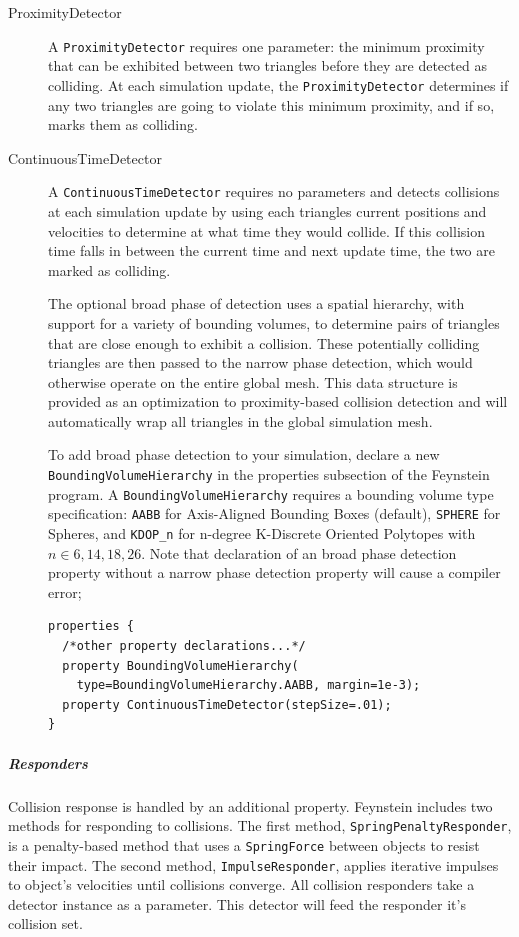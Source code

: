 \begin{description}
\item[ProximityDetector] A \texttt{ProximityDetector} requires one
  parameter: the minimum proximity that can be exhibited between two
  triangles before they are detected as colliding. At each simulation
  update, the \texttt{ProximityDetector} determines if any two
  triangles are going to violate this minimum proximity, and if so,
  marks them as colliding.

\item[ContinuousTimeDetector] A \texttt{ContinuousTimeDetector}
  requires no parameters and detects collisions at each simulation
  update by using each triangles current positions and velocities to
  determine at what time they would collide. If this collision time
  falls in between the current time and next update time, the two are
  marked as colliding.

  The optional broad phase of detection uses a spatial hierarchy, with
  support for a variety of bounding volumes, to determine pairs of
  triangles that are close enough to exhibit a collision. These
  potentially colliding triangles are then passed to the narrow phase
  detection, which would otherwise operate on the entire global
  mesh. This data structure is provided as an optimization to
  proximity-based collision detection and will automatically wrap all
  triangles in the global simulation mesh.

  To add broad phase detection to your simulation, declare a new
  \texttt{Bounding\-Volume\-Hierarchy} in the properties subsection of
  the Feynstein program. A \texttt{Bounding\-Volume\-Hierarchy}
  requires a bounding volume type specification: \texttt{AABB} for
  Axis-Aligned Bounding Boxes (default), \texttt{SPHERE} for Spheres,
  and \texttt{KDOP\_n} for n-degree K-Discrete Oriented Polytopes with
  $n \in {6, 14, 18, 26}$. Note that declaration of an broad phase
  detection property without a narrow phase detection property will
  cause a compiler error;

\begin{verbatim}
properties {
  /*other property declarations...*/
  property BoundingVolumeHierarchy(
    type=BoundingVolumeHierarchy.AABB, margin=1e-3);
  property ContinuousTimeDetector(stepSize=.01);
}
\end{verbatim}
\end{description}

\subparagraph{Responders}

Collision response is handled by an additional property. Feynstein
includes two methods for responding to collisions. The first method, \texttt{SpringPenaltyResponder},  is a penalty-based method that uses a \texttt{SpringForce} between objects to resist their impact. The second method, \texttt{ImpulseResponder}, applies iterative impulses to object's velocities until collisions converge. All collision responders take a detector instance as a parameter. This detector will feed the responder it's collision set.

